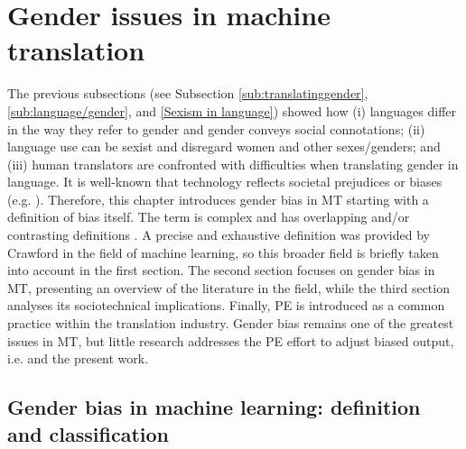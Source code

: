 \chapter{Gender issues in machine translation}

\label{Chapter2-2}
The previous subsections (see Subsection \ref{sub:translatinggender}, \ref{sub:language/gender}, and \ref{Sexism in language}) showed how (i) languages differ in the way they refer to gender and gender conveys social connotations; (ii) language use can be sexist and disregard women and other sexes/genders; and (iii) human translators are confronted with difficulties when translating gender in language. It is well-known that technology reflects societal prejudices or biases (e.g. \cite{bolukbasi2016man}). Therefore, this chapter introduces gender bias in MT starting with a definition of bias itself. The term is complex and has overlapping and/or contrasting definitions \citep{crawford2017keynote}. A precise and exhaustive definition was provided by Crawford in the field of machine learning, so this broader field is briefly taken into account in the first section. The second section focuses on gender bias in MT, presenting an overview of the literature in the field, while the third section analyses its sociotechnical implications. Finally, PE is introduced as a common practice within the translation industry. Gender bias remains one of the greatest issues in MT, but little research addresses the PE effort to adjust biased output, i.e. \textcite{savoldi2024harm} and the present work.

\section{Gender bias in machine learning: definition and classification} \label{sub:biasml}

